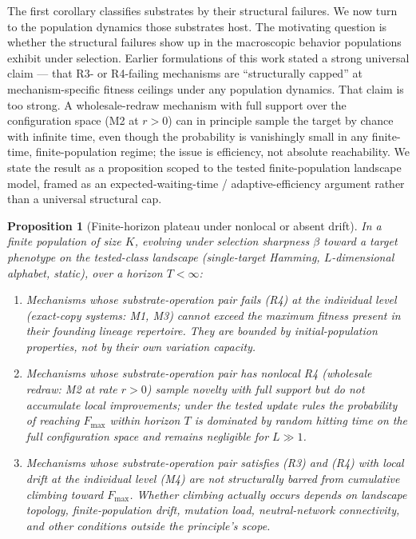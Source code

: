\documentclass[aps,prx,reprint,amsmath,amssymb,floatfix,superscriptaddress,nofootinbib]{revtex4-2}
\theoremstyle{plain-thm}
\newtheorem{proposition}[theorem]{Proposition}
\theoremstyle{definition-thm}
\begin{document}
The first corollary classifies substrates by their structural failures. We now turn to the population dynamics those substrates host. The motivating question is whether the structural failures show up in the macroscopic behavior populations exhibit under selection. Earlier formulations of this work stated a strong universal claim --- that R3- or R4-failing mechanisms are ``structurally capped'' at mechanism-specific fitness ceilings under any population dynamics. That claim is too strong. A wholesale-redraw mechanism with full support over the configuration space (M2 at $r > 0$) can in principle sample the target by chance with infinite time, even though the probability is vanishingly small in any finite-time, finite-population regime; the issue is efficiency, not absolute reachability. We state the result as a proposition scoped to the tested finite-population landscape model, framed as an expected-waiting-time / adaptive-efficiency argument rather than a universal structural cap.

\begin{proposition}[Finite-horizon plateau under nonlocal or absent drift]
\label{prop:plateau}
In a finite population of size $K$, evolving under selection sharpness $\beta$ toward a target phenotype on the tested-class landscape (single-target Hamming, $L$-dimensional alphabet, static), over a horizon $T < \infty$:
\begin{enumerate}
\item Mechanisms whose substrate-operation pair fails (R4) at the individual level (exact-copy systems: M1, M3) cannot exceed the maximum fitness present in their founding lineage repertoire. They are bounded by initial-population properties, not by their own variation capacity.
\item Mechanisms whose substrate-operation pair has nonlocal R4 (wholesale redraw: M2 at rate $r > 0$) sample novelty with full support but do not accumulate local improvements; under the tested update rules the probability of reaching $F_{\max}$ within horizon $T$ is dominated by random hitting time on the full configuration space and remains negligible for $L \gg 1$.
\item Mechanisms whose substrate-operation pair satisfies (R3) and (R4) with local drift at the individual level (M4) are not structurally barred from cumulative climbing toward $F_{\max}$. Whether climbing actually occurs depends on landscape topology, finite-population drift, mutation load, neutral-network connectivity, and other conditions outside the principle's scope.
\end{enumerate}
\end{proposition}
\end{document}
